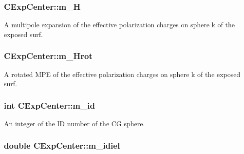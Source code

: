 \hypertarget{classCExpCenter_a6cf480aad64c9baf8a126d308ca63f85}{
\subsubsection[{m\-\_\-\-H}]{ C\-Exp\-Center\-::m\-\_\-\-H\hspace{0.3cm}{\ttfamily [protected]}}}\label{classCExpCenter_a6cf480aad64c9baf8a126d308ca63f85}


A multipole expansion of the effective polarization charges on sphere k of the exposed surf. 

\hypertarget{classCExpCenter_acfe6c4c74d9fd3069d00fef085eafbd8}{
\subsubsection[{m\-\_\-\-Hrot}]{ C\-Exp\-Center\-::m\-\_\-\-Hrot\hspace{0.3cm}{\ttfamily [protected]}}}\label{classCExpCenter_acfe6c4c74d9fd3069d00fef085eafbd8}


A rotated M\-P\-E of the effective polarization charges on sphere k of the exposed surf. 

\hypertarget{classCExpCenter_a7dcda3540f2ff0b3bfd668889ef1e95a}{
\subsubsection[{m\-\_\-id}]{\setlength{\rightskip}{0pt plus 5cm}int C\-Exp\-Center\-::m\-\_\-id\hspace{0.3cm}{\ttfamily [protected]}}}\label{classCExpCenter_a7dcda3540f2ff0b3bfd668889ef1e95a}


An integer of the I\-D number of the C\-G sphere. 

\hypertarget{classCExpCenter_a2ebe2d840aaaa9329706514fa6957efa}{
\subsubsection[{m\-\_\-idiel}]{\setlength{\rightskip}{0pt plus 5cm}double C\-Exp\-Center\-::m\-\_\-idiel\hspace{0.3cm}{\ttfamily [protected]}}}\label{classCExpCenter_a2ebe2d840aaaa9329706514fa6957efa}


